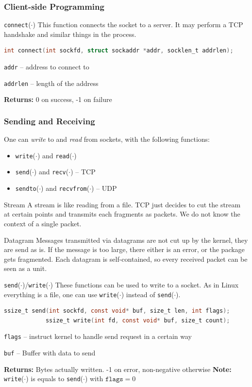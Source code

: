 \documentclass[english]{panikzettel}
\newcommand{\fkt}[1]{\texttt{#1}(\(\cdot\))}
\begin{document}
	\subsubsection{Client-side Programming}

	\begin{defi}{\fkt{connect}}
		This function connects the socket to a server.
		It may perform a TCP handshake and similar things in the process.
		\begin{lstlisting}[language=C]
			int connect(int sockfd, struct sockaddr *addr, socklen_t addrlen);
		\end{lstlisting}
		\tcblower
		\texttt{addr} – address to connect to

		\texttt{addrlen} – length of the address

		\textbf{Returns:} 0 on success, -1 on failure
	\end{defi}
	
	\subsubsection{Sending and Receiving}
	
	One can \textit{write} to and \textit{read} from sockets, with the following functions:
	\begin{itemize}
		\item \fkt{write} and \fkt{read}
		\item \fkt{send} and \fkt{recv} – TCP
		\item \fkt{sendto} and \fkt{recvfrom} – UDP
	\end{itemize}
	
	\begin{defi}{Stream}
		A stream is like reading from a file. TCP just decides to cut the stream at certain points and transmits each fragments as packets.
		We do not know the context of a single packet.
	\end{defi}

	\begin{defi}{Datagram}
		Messages transmitted via datagrams are not cut up by the kernel, they are send as is. If the message is too large, there either is an error, or the package gets fragmented. 
		Each datagram is self-contained, so every received packet can be seen as a unit. 
 	\end{defi}

	\begin{defi}{\fkt{send}/\fkt{write}}
		These functions can be used to write to a socket. 
		As in Linux everything is a file, one can use \fkt{write} instead of \fkt{send}.
		\begin{lstlisting}[language=C]
			ssize_t send(int sockfd, const void* buf, size_t len, int flags);
			ssize_t write(int fd, const void* buf, size_t count);
		\end{lstlisting}
		\tcblower
		\texttt{flags} – instruct kernel to handle send request in a certain way

		\texttt{buf} – Buffer with data to send

		\textbf{Returns:} Bytes actually written. -1 on error, non-negative otherwise 
		\textbf{Note:} \fkt{write} is equals to \fkt{send} with \( \texttt{flags} = 0\)
	\end{defi}
\end{document}
